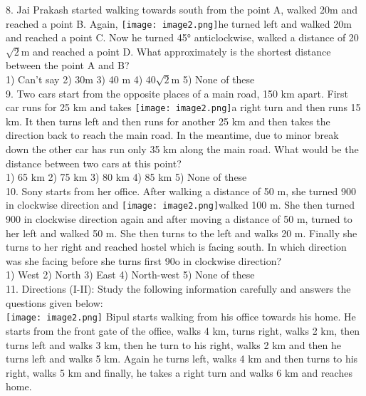 \documentclass[
]{article}
\begin{document}
8. Jai Prakash started walking towards south from the point A, walked 20m and reached a point B. Again, \texttt{[image: image2.png]}he turned left and walked 20m and reached a point C. Now he turned 45° anticlockwise, walked a distance of 20$\sqrt{2}$m and reached a point D. What approximately is the shortest distance between the point A and B?\\
1) Can't say \hspace{2mm}2) 30m \hspace{2mm}3) 40 m \hspace{2mm}4) 40$\sqrt{2}$m \hspace{2mm}5) None of these\\

9. Two cars start from the opposite places of a main road, 150 km apart. First car runs for 25 km and takes \texttt{[image: image2.png]}a right turn and then runs 15 km. It then turns left and then runs for another
25 km and then takes the direction back to reach the main road. In the meantime, due to
minor break down the other car has run only 35 km along the main road. What would be
the distance between two cars at this point?\\
1) 65 km \hspace{2mm}2) 75 km \hspace{2mm}3) 80 km \hspace{2mm}4) 85 km \hspace{2mm}5) None of these\\

10. Sony starts from her office. After walking a distance of 50 m, she turned 900 in clockwise direction and \texttt{[image: image2.png]}walked 100 m. She then turned 900 in clockwise direction again and after moving a distance of 50 m, turned to her left and walked 50 m. She then turns to the left and
walks 20 m. Finally she turns to her right and reached hostel which is facing south. In which direction was she facing before she turns first 90o in clockwise direction?\\
1) West \hspace{2mm}2) North \hspace{2mm}3) East
\hspace{2mm}4) North-west \hspace{2mm}5) None of these\\

11. Directions (I-II): Study the following information carefully and answers the questions given
below:\\
\texttt{[image: image2.png]}
Bipul starts walking from his office towards his home. He starts from the front gate of the
office, walks 4 km, turns right, walks 2 km, then turns left and walks 3 km, then he turn to
his right, walks 2 km and then he turns left and walks 5 km. Again he turns left, walks 4 km
and then turns to his right, walks 5 km and finally, he takes a right turn and walks 6 km and
reaches home.\\
\end{document}
